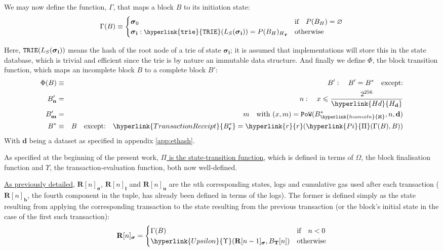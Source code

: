 \documentclass[9pt,oneside]{amsart}
\newcommand{\hcancel}[1]{%
    \tikz[baseline=(tocancel.base)]{
        \node[inner sep=0pt,outer sep=0pt] (tocancel) {#1};
        \draw[black] (tocancel.south west) -- (tocancel.north east);
    }%
}%
\begin{document}
\begin{multicols}{2}
\hypertarget{Gamma}{
We may now define the function, $\Gamma$, that maps a block $B$ to its initiation state:
\begin{equation}
\Gamma(B) \equiv \begin{cases}
\boldsymbol{\sigma}_0 & \text{if} \quad P(B_H) = \varnothing \\
\boldsymbol{\sigma}_\mathbf{i}: \mathtt{\small \hyperlink{trie}{TRIE}}(L_S(\boldsymbol{\sigma}_\mathbf{i})) = {P(B_H)_H}_\mathbf{r} & \text{otherwise}
\end{cases}
\end{equation}
}
Here, $\mathtt{\small TRIE}(L_S(\boldsymbol{\sigma}_\mathbf{i}))$ means the hash of the root node of a trie of state $\boldsymbol{\sigma}_\mathbf{i}$; it is assumed that implementations will store this in the state database, which is trivial and efficient since the trie is by nature an immutable data structure.
\hypertarget{Phi}{
And finally we define $\Phi$, the block transition function, which maps an incomplete block $B$ to a complete block $B'$:}
\begin{eqnarray}
\Phi(B) & \equiv & B': \quad B' = B^* \quad \text{except:} \\
B'_\mathbf{n} & = & n: \quad x \leqslant \frac{2^{256}}{\hyperlink{H d}{H_\mathbf{d}}} \\
B'_\mathbf{m} & = & m \quad \text{with } (x, m) = \mathtt{PoW}(B^*_{\hyperlink{h cancel n}{\hcancel{n}}}, n, \mathbf{d}) \\
B^* & \equiv & B \quad \text{except:} \quad {\hyperlink{Transaction Receipt}{B^*_\mathbf{r}}} = \hyperlink{r}{r}(\hyperlink{Pi}{\Pi}(\Gamma(B), B))
\end{eqnarray}
With $\mathbf{d}$ being a dataset as specified in appendix \ref{app:ethash}.

As specified at the beginning of the present work, \hyperlink{Pi}{$\Pi$ is the state-transition function}, which is defined in terms of \hyperlink{Omega}{$\Omega$}, the block finalisation function and \hyperlink{Upsilon}{$\Upsilon$}, the transaction-evaluation function, both now well-defined.

\hyperlink{Transaction Receipt}{As previously detailed}, $\mathbf{R}[n]_{\boldsymbol{\sigma}}$, $\mathbf{R}[n]_\mathbf{l}$ and $\mathbf{R}[n]_\mathbf{u}$ are the $n$th corresponding states, logs and cumulative gas used after each transaction ($\mathbf{R}[n]_\mathbf{b}$, the fourth component in the tuple, has already been defined in terms of the logs). The former is defined simply as the state resulting from applying the corresponding transaction to the state resulting from the previous transaction (or the block's initial state in the case of the first such transaction):
\begin{equation}
\mathbf{R}[n]_{\boldsymbol{\sigma}} = \begin{cases} \Gamma(B) & \text{if} \quad n < 0 \\ \hyperlink{Upsilon}{\Upsilon}(\mathbf{R}[n - 1]_{\boldsymbol{\sigma}}, B_\mathbf{T}[n]) & \text{otherwise} \end{cases}
\end{equation}


\end{multicols}
\end{document}
